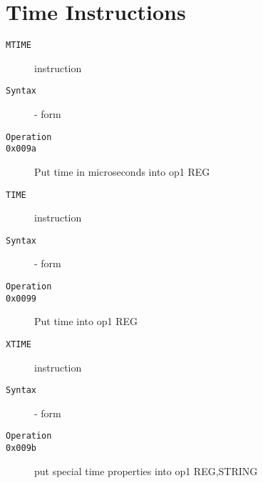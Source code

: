 \section{Time Instructions}
\begin{description}
\item[\texttt{MTIME}] instruction\\
\item[\texttt{Syntax}] - form \\

\item[\texttt{Operation}]
\item[\texttt{}]
\item[\texttt{0x009a}] Put time in microseconds into op1  {REG}               \\
\end{description}
\clearpage
\begin{description}
\item[\texttt{TIME}] instruction\\
\item[\texttt{Syntax}] - form \\

\item[\texttt{Operation}]
\item[\texttt{}]
\item[\texttt{0x0099}] Put time into op1  {REG}               \\
\end{description}
\clearpage
\begin{description}
\item[\texttt{XTIME}] instruction\\
\item[\texttt{Syntax}] - form \\

\item[\texttt{Operation}]
\item[\texttt{}]
\item[\texttt{0x009b}] put special time properties into op1  {REG,STRING}        \\
\end{description}
\clearpage
